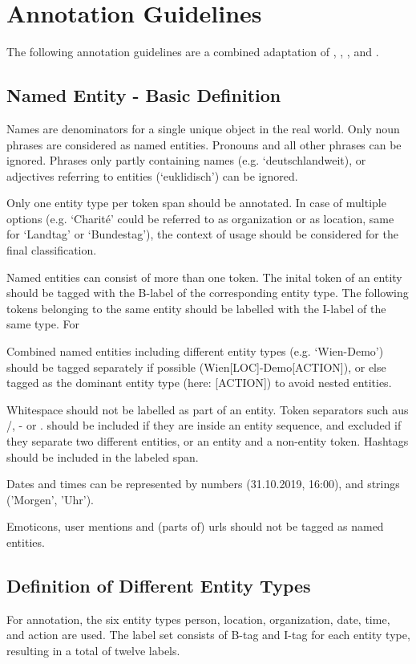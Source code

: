 \chapter*{Annotation Guidelines}
\label{cha:annotation_guide}

The following annotation guidelines are a combined adaptation of \cite{benikova-etal-2014-nosta}, \cite{ldc_2005}, \cite{muc7_ner}, and \cite{smartdata_anno}.


\section*{Named Entity - Basic Definition}

Names are denominators for a single unique object in the real world. Only noun phrases are considered as named entities. Pronouns and all other phrases can be ignored. 
Phrases only partly containing names (e.g. `deutschlandweit), or adjectives referring to entities (`euklidisch') can be ignored.

\noindent Only one entity type per token span should be annotated. In case of multiple options (e.g. `Charité' could be referred to as organization or as location, same for `Landtag' or `Bundestag'), the context of usage should be considered for the final classification. 

\noindent Named entities can consist of more than one token. The inital token of an entity should be tagged with the B-label of the corresponding entity type. The following tokens belonging to the same entity should be labelled with the I-label of the same type. For 

\noindent Combined named entities including different entity types (e.g. `Wien-Demo') should be tagged separately if possible (Wien[LOC]-Demo[ACTION]), or else tagged as the dominant entity type (here: [ACTION]) to avoid nested entities.

\noindent Whitespace should not be labelled as part of an entity. Token separators such aus /, - or . should be included if they are inside an entity sequence, and excluded if they separate two different entities, or an entity and a non-entity token. Hashtags should be included in the labeled span. 

\noindent Dates and times can be represented by numbers (31.10.2019, 16:00), and strings ('Morgen', 'Uhr'). 

\noindent Emoticons, user mentions and (parts of) urls should not be tagged as named entities. 

\section*{Definition of Different Entity Types}
For annotation, the six entity types person, location, organization, date, time, and action are used. The label set consists of B-tag and  I-tag for each entity type, resulting in a total of twelve labels. 

